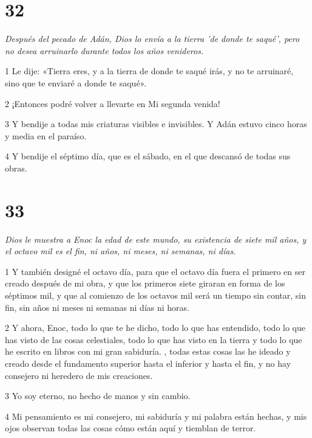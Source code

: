 \chapter{32}

\par \textit{Después del pecado de Adán, Dios lo envía a la tierra 'de donde te saqué', pero no desea arruinarlo durante todos los años venideros.}

\par 1 Le dije: «Tierra eres, y a la tierra de donde te saqué irás, y no te arruinaré, sino que te enviaré a donde te saqué».

\par 2 ¡Entonces podré volver a llevarte en Mi segunda venida!

\par 3 Y bendije a todas mis criaturas visibles e invisibles. Y Adán estuvo cinco horas y media en el paraíso.

\par 4 Y bendije el séptimo día, que es el sábado, en el que descansó de todas sus obras.

\chapter{33}

\par \textit{Dios le muestra a Enoc la edad de este mundo, su existencia de siete mil años, y el octavo mil es el fin, ni años, ni meses, ni semanas, ni días.}

\par 1 Y también designé el octavo día, para que el octavo día fuera el primero en ser creado después de mi obra, y que los primeros siete giraran en forma de los séptimos mil, y que al comienzo de los octavos mil será un tiempo sin contar, sin fin, sin años ni meses ni semanas ni días ni horas.

\par 2 Y ahora, Enoc, todo lo que te he dicho, todo lo que has entendido, todo lo que has visto de las cosas celestiales, todo lo que has visto en la tierra y todo lo que he escrito en libros con mi gran sabiduría. , todas estas cosas las he ideado y creado desde el fundamento superior hasta el inferior y hasta el fin, y no hay consejero ni heredero de mis creaciones.

\par 3 Yo soy eterno, no hecho de manos y sin cambio.

\par 4 Mi pensamiento es mi consejero, mi sabiduría y mi palabra están hechas, y mis ojos observan todas las cosas cómo están aquí y tiemblan de terror.

